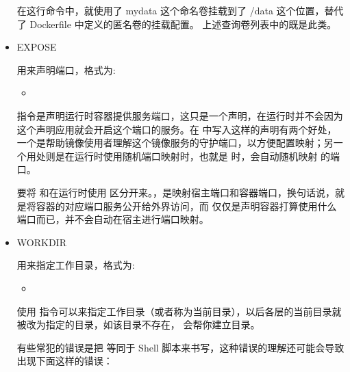 \documentclass[letterpaper,10pt,english]{sphinxmanual}
\begin{document}
\begin{itemize}
在这行命令中，就使用了 mydata 这个命名卷挂载到了 /data 这个位置，替代了 Dockerfile 中定义的匿名卷的挂载配置。
上述查询卷列表中的既是此类。

\item {} 
EXPOSE

用来声明端口，格式为:
\begin{itemize}
\item {} 

\end{itemize}

 指令是声明运行时容器提供服务端口，这只是一个声明，在运行时并不会因为这个声明应用就会开启这个端口的服务。在  中写入这样的声明有两个好处，一个是帮助镜像使用者理解这个镜像服务的守护端口，以方便配置映射；另一个用处则是在运行时使用随机端口映射时，也就是  时，会自动随机映射  的端口。

要将  和在运行时使用  区分开来。，是映射宿主端口和容器端口，换句话说，就是将容器的对应端口服务公开给外界访问，而  仅仅是声明容器打算使用什么端口而已，并不会自动在宿主进行端口映射。

\item {} 
WORKDIR

用来指定工作目录，格式为:
\begin{itemize}
\item {} 

\end{itemize}

使用  指令可以来指定工作目录（或者称为当前目录），以后各层的当前目录就被改为指定的目录，如该目录不存在， 会帮你建立目录。

有些常犯的错误是把  等同于 Shell 脚本来书写，这种错误的理解还可能会导致出现下面这样的错误：

\begin{sphinxVerbatim}[commandchars=\\\{\}]
  
    
\end{sphinxVerbatim}


\end{itemize}
\end{document}
